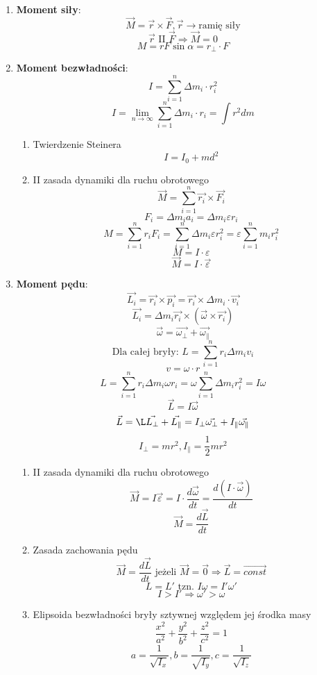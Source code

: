 \documentclass{article}
\begin{document}
\begin{enumerate}
		\item \textbf{Moment siły}:
		\[
		\vec{M} = \vec{r} \times \vec{F}, \vec{r} \longrightarrow \text{ramię siły}
		\]
		\[
		\vec{r} \text{ II } \vec{F} \Rightarrow \vec{M} = 0		
		\]
		\[
		M = rF\sin\alpha = r_{\perp} \cdot F
		\]
		
		\item \textbf{Moment bezwładności}:
		\[
		I = \sum\limits_{i = 1}^n \Delta m_i \cdot r^2_i
		\]
		\[
		I = \lim\limits_{n \rightarrow \infty} \sum\limits_{i = 1}^n \Delta m_i \cdot r_i = \int r^2 dm
		\]
		\begin{enumerate}
			\item Twierdzenie Steinera
			\[
			I = I_0 + md^2
			\]
			\item II zasada dynamiki dla ruchu obrotowego
			\[
			\vec{M} = \sum\limits_{i = 1}^n \vec{r_i} \times \vec{F_i}
			\]
			\[
			F_i = \Delta m_i a_i = \Delta m_i \varepsilon r_i
			\]
			\[
			M = \sum\limits_{i = 1}^n r_i F_i = \sum\limits_{i = 1}^n \Delta m_i \varepsilon r_i^2 = \varepsilon \sum\limits_{i = 1}^n m_i r_i^2
			\]
			\[
			M = I \cdot \varepsilon
			\]
			\[
			\vec{M} = I \cdot \vec{\varepsilon}
			\]
		\end{enumerate}
		
		\item \textbf{Moment pędu}:
		\[
		\vec{L_i} = \vec{r_i} \times \vec{p_i} = \vec{r_i} \times \Delta m_i \cdot \vec{v_i}
		\]
		\[
		\vec{L_i} = \Delta m_i \vec{r_i} \times (\vec{\omega} \times \vec{r_i})
		\]
		\[
		\vec{\omega} = \vec{\omega_{\perp}} + \vec{\omega_{\parallel}}
		\]
		\[
		\text{Dla całej bryły: }
		L = \sum\limits_{i = 1}^n r_i \Delta m_i v_i
		\]
		\[
		v = \omega \cdot r
		\]
		\[
		L = \sum\limits_{i = 1}^n r_i \Delta m_i \omega r_i = \omega \sum\limits_{i = 1}^n \Delta m_i r_i^2 = I \omega
		\]
		\[
		\vec{L} = I \vec{\omega}
		\]
		\[
		\vec{L} = \L\vec{L_{\perp}} + \vec{L_{\parallel}} = I_{\perp} \vec{\omega_{\perp}} + I_{\parallel} \vec{\omega_{\parallel}}
		\]
		\[
		I_{\perp} = mr^2, I_{\parallel} = \frac{1}{2} mr^2
		\]
		\begin{enumerate}
			\item II zasada dynamiki dla ruchu obrotowego
			\[
			\vec{M} = I \vec{\varepsilon} = I \cdot \frac{d \vec{\omega}}{dt} = \frac{d(I \cdot \vec{\omega})}{dt}
			\]
			\[
			\vec{M} = \frac{d \vec{L}}{dt}
			\]
			\item Zasada zachowania pędu
			\[
			\vec{M} = \frac{d \vec{L}}{dt} \text{ jeżeli } \vec{M} = \vec{0} \Rightarrow \vec{L} = \overrightarrow{const}
			\]
			\[
			L = L' \text{ tzn. } I \omega = I' \omega '
			\]
			\[
			I > I' \Rightarrow \omega ' > \omega
			\]
			\item Elipsoida bezwładności bryły sztywnej względem jej środka masy
			\[
			\frac{x^2}{a^2} + \frac{y^2}{b^2} + \frac{z^2}{c^2} = 1
			\]
			\[
			a = \frac{1}{\sqrt{I_x}}, b = \frac{1}{\sqrt{I_y}}, c = \frac{1}{\sqrt{I_z}}
			\]
		\end{enumerate}
		

\end{enumerate}
\end{document}
